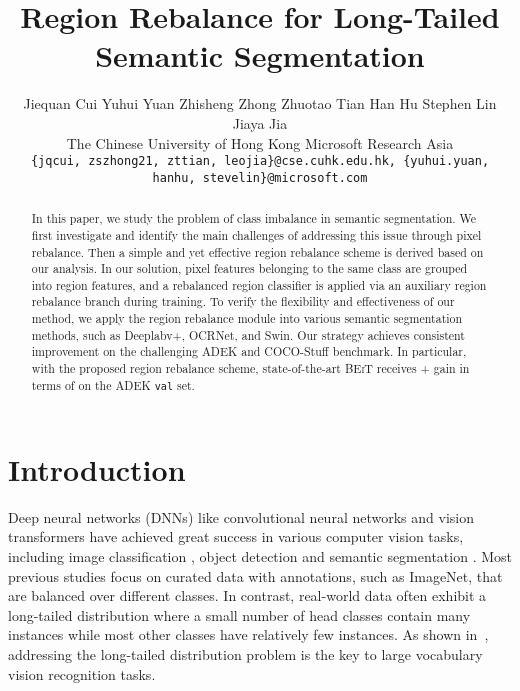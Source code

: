 \documentclass[final]{cvpr}
\begin{document}
\title{Region Rebalance for Long-Tailed Semantic Segmentation}
\author{
	Jiequan Cui  \quad 
	Yuhui Yuan  \quad
	Zhisheng Zhong  \quad
	Zhuotao Tian  \quad
	Han Hu  \quad
	Stephen Lin  \quad
	Jiaya Jia  \\
	The Chinese University of Hong Kong \hspace{1cm} Microsoft Research Asia \hspace{1cm} 
    \vspace{.7em}\\
	{\tt\small \{jqcui, zszhong21, zttian, leojia\}@cse.cuhk.edu.hk, \{yuhui.yuan, hanhu, stevelin\}@microsoft.com}
}

\maketitle

\begin{abstract}
In this paper, we study the problem of class imbalance in semantic segmentation.
We first investigate and identify the main challenges of addressing this issue through pixel rebalance. Then a simple and yet effective region rebalance scheme is derived based on our analysis. In our solution, pixel features belonging to the same class are grouped into region features, and a rebalanced region classifier is applied via an auxiliary region rebalance branch during training.
To verify the flexibility and effectiveness of our method,
we apply the region rebalance module into various semantic segmentation methods, such as Deeplabv+, OCRNet, and Swin.
Our strategy achieves consistent improvement on the challenging ADEK and COCO-Stuff benchmark.
In particular, with the proposed region rebalance scheme, state-of-the-art \textsc{BEiT} receives +\textbf{} gain in terms of  on the ADEK \texttt{val} set.
\end{abstract}


\section{Introduction}
Deep neural networks (DNNs) like convolutional neural networks \cite{alexnet,he2016deep,vggnet,googlenet} and vision transformers \cite{dosovitskiy2020image, touvron2021training, liu2021swin} have achieved great success in various computer vision tasks, including image classification \cite{alexnet,he2016deep,vggnet,googlenet}, object detection \cite{ren2015faster,DBLP:conf/cvpr/LinDGHHB17,DBLP:conf/cvpr/LiuQQSJ18} and semantic segmentation \cite{DBLP:conf/cvpr/ZhaoSQWJ17, chen2018encoder, xiao2018unified, yuan2020object}.
Most previous studies focus on curated data with annotations, such as ImageNet, that are balanced over different classes. In contrast, real-world data often exhibit a long-tailed distribution where a small number of head classes contain many instances while most other classes have relatively few instances.
As shown in~\cite{Gupta2019LVIS}, addressing the long-tailed distribution problem is the key to large vocabulary vision recognition tasks.
\end{document}
